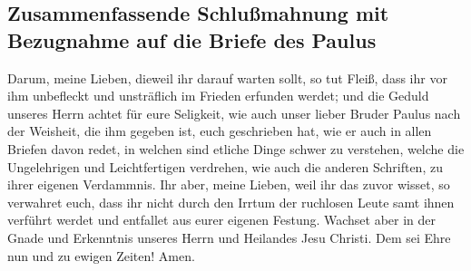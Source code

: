 \hypertarget{zusammenfassende-schluuxdfmahnung-mit-bezugnahme-auf-die-briefe-des-paulus}{%
\subsection{Zusammenfassende Schlußmahnung mit Bezugnahme auf die Briefe
des
Paulus}\label{zusammenfassende-schluuxdfmahnung-mit-bezugnahme-auf-die-briefe-des-paulus}}

 Darum, meine Lieben, dieweil ihr darauf warten sollt, so
tut Fleiß, dass ihr vor ihm unbefleckt und unsträflich im Frieden
erfunden werdet;  und die Geduld unseres Herrn achtet für
eure Seligkeit, wie auch unser lieber Bruder Paulus nach der Weisheit,
die ihm gegeben ist, euch geschrieben hat,  wie er auch
in allen Briefen davon redet, in welchen sind etliche Dinge schwer zu
verstehen, welche die Ungelehrigen und Leichtfertigen verdrehen, wie
auch die anderen Schriften, zu ihrer eigenen Verdammnis. 
Ihr aber, meine Lieben, weil ihr das zuvor wisset, so verwahret euch,
dass ihr nicht durch den Irrtum der ruchlosen Leute samt ihnen verführt
werdet und entfallet aus eurer eigenen Festung.  Wachset
aber in der Gnade und Erkenntnis unseres Herrn und Heilandes Jesu
Christi. Dem sei Ehre nun und zu ewigen Zeiten! Amen.
